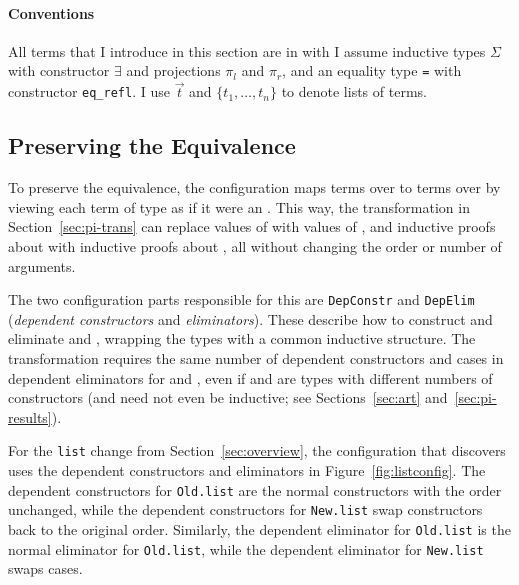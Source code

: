 \paragraph{Conventions} All terms that I introduce in this section are in  with 
I assume inductive types $\Sigma$ with constructor $\exists$ and projections $\pi_l$ and $\pi_r$,
and an equality type \lstinline{=} with constructor \lstinline{eq_refl}.
I use $\vec{t}$ and $\{t_1, \ldots, t_n\}$ to denote lists of terms.

\subsection{Preserving the Equivalence}
\label{sec:pi-diff-equiv}

To preserve the equivalence, the configuration maps terms over \Aa to terms over \B by viewing each
term of type \B as if it were an \Aa.
This way, the transformation in Section~\ref{sec:pi-trans} can replace values of \Aa with values of \B, and
inductive proofs about \Aa with inductive proofs about \B, %
all without changing the order or number of arguments.

The two configuration parts responsible for this are \lstinline{DepConstr}
and \lstinline{DepElim} (\textit{dependent constructors} and \textit{eliminators}).
These describe how to construct and eliminate \Aa and \B, wrapping the types with a common inductive structure.
The transformation requires the same number of dependent constructors and cases in dependent eliminators for \Aa and \B,
even if \Aa and \B are types with different numbers of constructors
(\Aa and \B need not even be inductive; see Sections~\ref{sec:art} and~\ref{sec:pi-results}).

For the \lstinline{list} change from Section~\ref{sec:overview},
the configuration that \toolnamec discovers uses the dependent constructors
and eliminators in Figure~\ref{fig:listconfig}. The dependent constructors for \lstinline{Old.list}
are the normal constructors with the order unchanged,
while the dependent constructors for \lstinline{New.list} swap constructors
back to the original order.
Similarly, the dependent eliminator for \lstinline{Old.list} is the normal eliminator for \lstinline{Old.list},
while the dependent eliminator for \lstinline{New.list} swaps cases.

